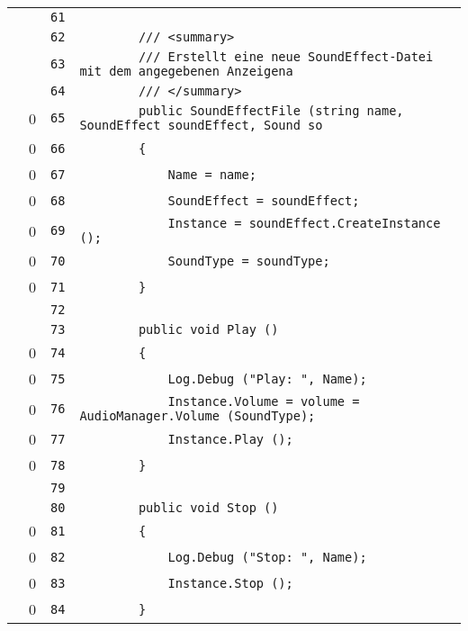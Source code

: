 \documentclass[a4paper,10pt]{article}
\begin{document}
\begin{longtable}[l]{lrrl}
\cellcolor{gray} &  & \verb~61~ & \verb~~\\
\cellcolor{gray} &  & \verb~62~ & \verb~        /// <summary>~\\
\cellcolor{gray} &  & \verb~63~ & \verb~        /// Erstellt eine neue SoundEffect-Datei mit dem angegebenen Anzeigena~\\
\cellcolor{gray} &  & \verb~64~ & \verb~        /// </summary>~\\
\cellcolor{red} & 0 & \verb~65~ & \verb~        public SoundEffectFile (string name, SoundEffect soundEffect, Sound so~\\
\cellcolor{red} & 0 & \verb~66~ & \verb~        {~\\
\cellcolor{red} & 0 & \verb~67~ & \verb~            Name = name;~\\
\cellcolor{red} & 0 & \verb~68~ & \verb~            SoundEffect = soundEffect;~\\
\cellcolor{red} & 0 & \verb~69~ & \verb~            Instance = soundEffect.CreateInstance ();~\\
\cellcolor{red} & 0 & \verb~70~ & \verb~            SoundType = soundType;~\\
\cellcolor{red} & 0 & \verb~71~ & \verb~        }~\\
\cellcolor{gray} &  & \verb~72~ & \verb~~\\
\cellcolor{gray} &  & \verb~73~ & \verb~        public void Play ()~\\
\cellcolor{red} & 0 & \verb~74~ & \verb~        {~\\
\cellcolor{red} & 0 & \verb~75~ & \verb~            Log.Debug ("Play: ", Name);~\\
\cellcolor{red} & 0 & \verb~76~ & \verb~            Instance.Volume = volume = AudioManager.Volume (SoundType);~\\
\cellcolor{red} & 0 & \verb~77~ & \verb~            Instance.Play ();~\\
\cellcolor{red} & 0 & \verb~78~ & \verb~        }~\\
\cellcolor{gray} &  & \verb~79~ & \verb~~\\
\cellcolor{gray} &  & \verb~80~ & \verb~        public void Stop ()~\\
\cellcolor{red} & 0 & \verb~81~ & \verb~        {~\\
\cellcolor{red} & 0 & \verb~82~ & \verb~            Log.Debug ("Stop: ", Name);~\\
\cellcolor{red} & 0 & \verb~83~ & \verb~            Instance.Stop ();~\\
\cellcolor{red} & 0 & \verb~84~ & \verb~        }~\\

\end{longtable}
\end{document}
